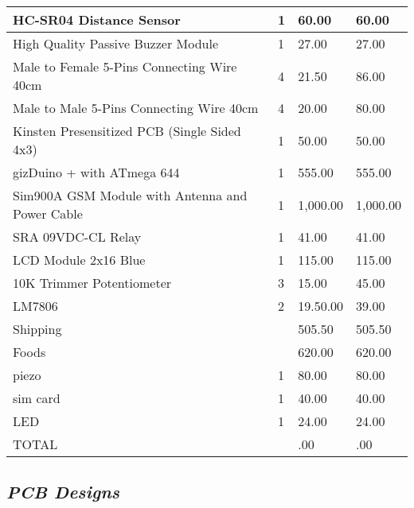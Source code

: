 \documentclass[11pt]{article}
\begin{document}
{\begin{table}[h!]
\begin{center}
\begin{tabular}{|l|l|l|l|}
      \hline {\small HC-SR04 Distance Sensor}                           &1  &60.00    &60.00\\
      \hline {\small High Quality Passive Buzzer Module}	            &1	&27.00	   &27.00\\
      \hline {\small Male to Female 5-Pins Connecting Wire 40cm}	    &4	&21.50	   &86.00\\
      \hline {\small Male to Male 5-Pins Connecting Wire 40cm}	        &4	&20.00	   &80.00\\ 
      \hline {\small Kinsten Presensitized PCB (Single Sided 4x3)}    	&1	&50.00	   &50.00\\
      \hline {\small gizDuino + with ATmega 644}	                    &1	&555.00   &555.00\\
      \hline {\small Sim900A GSM Module with Antenna and Power Cable}	&1	&1,000.00 &1,000.00\\
      \hline {\small SRA 09VDC-CL Relay}                                &1	&41.00	   &41.00\\ 
      \hline {\small LCD Module 2x16 Blue}                              &1	&115.00   &115.00\\
      \hline {\small 10K Trimmer Potentiometer}                         &3	&15.00	   &45.00\\
      \hline {\small LM7806}                                            &2	&19.50.00 &39.00\\
      \hline {\small Shipping}                                          &   &505.50   &505.50\\ 
      \hline {\small Foods}                                             &   &620.00   &620.00\\
      \hline {\small piezo}                                             &1   &80.00    &80.00\\
      \hline {\small sim card}                                         &1    &40.00    &40.00\\
       \hline {\small LED}                                              &1 &24.00 &24.00 \\
       \hline {\small TOTAL}                                             &   &.00      &.00\\
         \hline
      
    \end{tabular}
  \end{center}
\end{table}


\subsection{\emph{PCB Designs}}\

}
\end{document}
